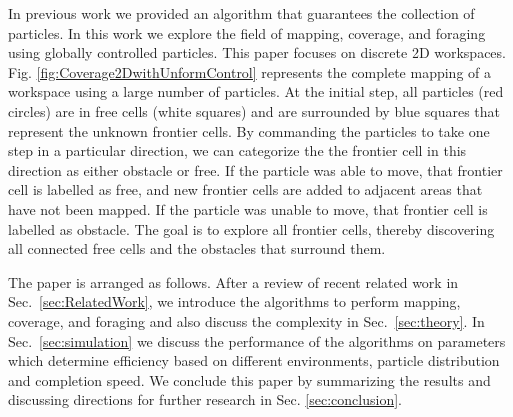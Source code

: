 In previous work \cite{mahadev2016collecting} we provided an algorithm that guarantees the collection of particles.
 In this work we explore the field of mapping, coverage, and foraging using globally controlled particles. 
 This paper focuses on discrete 2D workspaces.
Fig. \ref{fig:Coverage2DwithUnformControl} represents the complete mapping of a workspace using a large number of particles.  
At the initial step, all  particles (red circles) are in free cells (white squares) and are surrounded by blue squares that represent the unknown frontier cells.
By commanding the particles to take one step in a particular direction, we can categorize the the frontier cell in this direction as either obstacle or free.
 If the particle was able to move, that frontier cell is labelled as free, and new frontier cells are added to adjacent areas that have not been mapped.
 If the particle was unable to move, that frontier cell is labelled as obstacle.
The goal is to explore all  frontier cells, thereby discovering all connected free cells and the obstacles that surround them. 

The paper is arranged as follows. 
After a review of recent related work in Sec.~\ref{sec:RelatedWork}, we introduce the algorithms to perform mapping, coverage, and foraging and also discuss the complexity in Sec.~\ref{sec:theory}.
 In Sec.~\ref{sec:simulation} we discuss the performance of the algorithms on parameters which determine efficiency based on different environments, particle distribution and completion speed. We conclude this paper by summarizing the results and discussing
 directions for further research in Sec.  \ref{sec:conclusion}.

